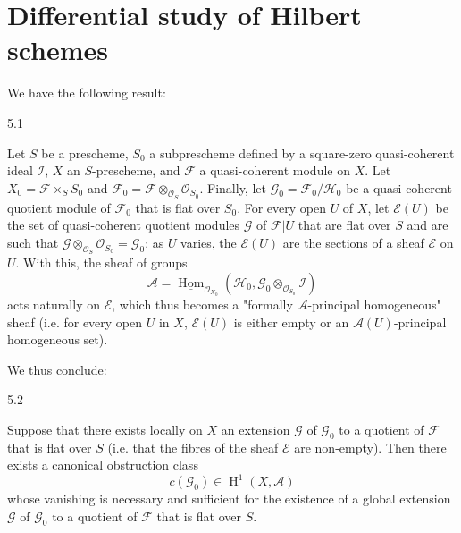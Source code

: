 \begin{enumerate}
\end{enumerate}\chapter{Differential study of Hilbert schemes}\thispagestyle{fancy}\label{fga3.iv-5}\par{}We have the following result:\begin{proposition}{5.1}\label{fga3.iv-5-proposition-5.1}\skipsinglepar\par{}Let \(S\) be a prescheme, \(S_0\) a subprescheme defined by a square-zero quasi-coherent ideal \(\mathscr {I}\), \(X\) an \(S\)-prescheme, and \(\mathscr {F}\) a quasi-coherent module on \(X\).
    Let \(X_0=\mathscr {F}\times _S S_0\) and \(\mathscr {F}_0=\mathscr {F}\otimes _{\mathcal {O}_S}\mathcal {O}_{S_0}\).
    Finally, let \(\mathscr {G}_0=\mathscr {F}_0/\mathscr {H}_0\) be a quasi-coherent quotient module of \(\mathscr {F}_0\) that is flat over \(S_0\).
    For every open \(U\) of \(X\), let \(\mathscr {E}(U)\) be the set of quasi-coherent quotient modules \(\mathscr {G}\) of \(\mathscr {F}|U\) that are flat over \(S\) and are such that \(\mathscr {G}\otimes _{\mathcal {O}_S}\mathcal {O}_{S_0}=\mathscr {G}_0\);
    as \(U\) varies, the \(\mathscr {E}(U)\) are the sections of a sheaf \(\mathscr {E}\) on \(U\).
    With this, the sheaf of groups
    \[       \mathscr {A}       = \underline {\operatorname {Hom}}_{\mathcal {O}_{X_0}}(\mathscr {H}_0,\mathscr {G}_0\otimes _{\mathcal {O}_{S_0}}\mathscr {I})     \]
    acts naturally on \(\mathscr {E}\), which thus becomes a "formally \(\mathscr {A}\)-principal homogeneous" sheaf (i.e. for every open \(U\) in \(X\), \(\mathscr {E}(U)\) is either empty or an \(\mathscr {A}(U)\)-principal homogeneous set).\end{proposition}\par{}We thus conclude:\begin{corollary}{5.2}\label{fga3.iv-5-corollary-5.2}\skipsinglepar\par{}Suppose that there exists locally on \(X\) an extension \(\mathscr {G}\) of \(\mathscr {G}_0\) to a quotient of \(\mathscr {F}\) that is flat over \(S\) (i.e. that the fibres of the sheaf \(\mathscr {E}\) are non-empty).
    Then there exists a canonical obstruction class
    \[       c(\mathscr {G}_0) \in  \operatorname {H}^1(X,\mathscr {A})     \]
    whose vanishing is necessary and sufficient for the existence of a global extension \(\mathscr {G}\) of \(\mathscr {G}_0\) to a quotient of \(\mathscr {F}\) that is flat over \(S\).

\end{corollary}
